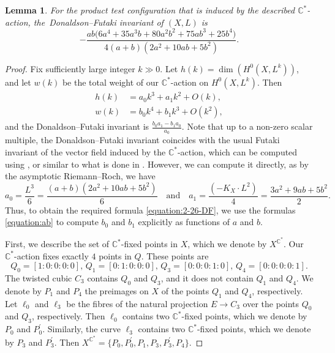 \documentclass[12pt]{amsart}
\newtheorem{lemma}[theorem]{Lemma}
\theoremstyle{definition}
\theoremstyle{remark}
\newcommand{\C}{\mathbb{C}}
\begin{document}
\begin{lemma}
\label{lemma:2-26-DF}
For the product test configuration that is induced by the described $\C^*$-action, the~Donaldson--Futaki invariant of $(X,L)$ is
\begin{equation}
\label{equation:2-26-DF}
-\frac{ab\bigl(6a^4+35a^3b+80a^2b^2+75ab^3+25b^4\bigr)}{4(a+b)(2a^2+10ab+5b^2)}.
\end{equation}
\end{lemma}

\begin{proof}
Fix sufficiently large integer $k\gg 0$. Let $h(k)=\dim(H^0(X,L^k))$, and let $w(k)$ be the total weight of our $\C^*$-action on $H^0(X,L^k)$.
Then
\begin{align*}
h(k)&=a_0k^3+a_1k^2+O(k),\\
w(k)&=b_0k^4+b_1k^3+O(k^2),
\end{align*}
and the Donaldson--Futaki invariant is $\frac{b_0a_1-b_1a_0}{a_0}$. Note that up to a non-zero scalar multiple, the Donaldson--Futaki invariant coincides with the usual Futaki invariant of the vector field induced by the $\mathbb{C}^*$-action, which can be computed using \cite[Corollary~2.13]{Maschler}, \cite[\S~3]{Legendre} or \cite[Theorem~1.4]{Tian} similar to what is done in \cite[Example 4.9]{Stoppa2024}. However, we can compute it directly, as by the asymptotic Riemann--Roch, we have
$$
a_0=\frac{L^3}{6}=\frac{(a+b)(2a^2+10ab+5b^2)}{6}
\quad
\text{and}
\quad
a_1=\frac{(-K_X\cdot L^2)}{4}=\frac{3a^2+9ab+5b^2}{2}.
$$
Thus, to obtain the required formula \eqref{equation:2-26-DF}, we  use the formulas \eqref{equation:ab} to compute $b_0$ and $b_1$ explicitly as functions of $a$ and $b$.

First, we describe the set of $\mathbb{C}^*$-fixed points in $X$, which we denote by
$X^{\C^*}$. Our $\mathbb{C}^*$-action fixes exactly $4$ points in $Q$. These points are
$$
Q_0=[1:0:0:0:0],\,
Q_1=[0:1:0:0:0],\,
Q_3=[0:0:0:1:0],\,
Q_4=[0:0:0:0:1].
$$
The twisted cubic $C_3$ contains $Q_0$ and $Q_3$, and it does not contain $Q_1$ and $Q_4$.
We denote by $P_1$ and $P_4$ the preimages on $X$ of the points $Q_1$ and $Q_4$, respectively.
Let $\ell_0$ and $\ell_3$ be the fibres of the natural projection $E\to C_3$ over the points $Q_0$ and $Q_3$, respectively.
Then $\ell_0$ contains two $\mathbb{C}^*$-fixed points, which we denote by $P_0$ and $P_0^\prime$.
Similarly, the curve $\ell_3$ contains two $\mathbb{C}^*$-fixed points, which we denote by $P_3$ and $P_3^\prime$.
Then $X^{\C^*}=\{P_0,P_0^\prime,P_1,P_3,P_3^\prime,P_4\}$.


\end{proof}
\end{document}
